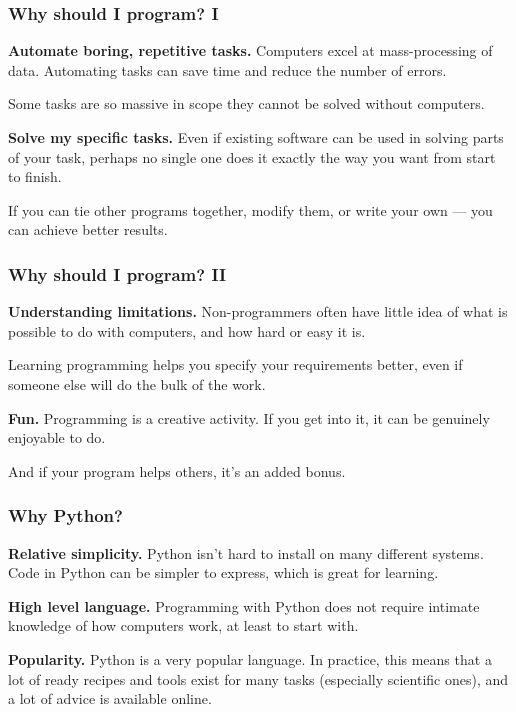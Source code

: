 \documentclass[english,serif,mathserif,xcolor=pdftex,dvipsnames,table]{beamer}
\begin{document}
\begin{frame}
  \frametitle{Why should I program? I}

  \textbf{Automate boring, repetitive tasks.} Computers excel at mass-processing
    of data. Automating tasks can save time and reduce the number of errors.

  \+
  Some tasks are so massive in scope they cannot be solved without computers.

  \+
  \textbf{Solve my specific tasks.} Even if existing software
  can be used in solving parts of your task, perhaps no single one does it
  exactly the way you want from start to finish.
  
  \+
  If you can tie other programs together, modify them, or write your own --- you can achieve better results.
\end{frame}

\begin{frame}
  \frametitle{Why should I program? II}

  \textbf{Understanding limitations.} Non-programmers often have little idea of
  what is possible to do with computers, and how hard or easy it is.
  
  \+
  Learning programming helps you specify your requirements better, even if someone
  else will do the bulk of the work.

  \+
  \textbf{Fun.} Programming is a creative activity. If you get into it, it can be
  genuinely enjoyable to do.
  
  \+
  And if your program helps others, it's an added bonus.
\end{frame}

\begin{frame}
  \frametitle{Why Python?}

  \textbf{Relative simplicity.} Python isn't hard to install on many different systems.
  Code in Python can be simpler to express, which is great for learning.

  \+
  \textbf{High level language.} Programming with Python does not require intimate
  knowledge of how computers work, at least to start with.

  \+
  \textbf{Popularity.} Python is a very popular language. In practice,
  this means that a lot of ready recipes and tools exist for many tasks (especially scientific ones),
  and a lot of advice is available online.

\end{frame}
\end{document}
